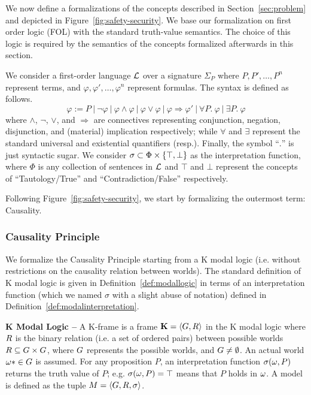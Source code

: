 We now define a formalizations of the concepts described in
Section~\ref{sec:problem} and depicted in Figure~\ref{fig:safety-security}. We
base our formalization on first order logic (FOL) with the standard
truth-value semantics. The choice of this logic is required by the 
semantics of the concepts formalized afterwards in this section. 

We consider a first-order language $\mathcal{L}$ over a
signature $\Sigma_P$ where $P,P',\ldots,P^n$ represent terms, and
$\varphi,\varphi',\ldots,\varphi^n$ represent formulas.
The syntax is defined as follows.
\begin{displaymath}
	\varphi := P~|~\neg\varphi~|~\varphi\wedge\varphi~|~\varphi\vee\varphi~|~\varphi\Rightarrow\varphi'~|~\forall P.~\varphi~|~\exists P.~\varphi
\end{displaymath}
where $\wedge$, $\neg$, $\vee$, and $\Rightarrow$ are connectives representing
conjunction, negation, disjunction, and (material) implication respectively; while
$\forall$ and $\exists$ represent the standard universal and existential
quantifiers (resp.). Finally, the symbol ``$.$'' is just syntactic sugar. 
We consider $\sigma\subset\Phi\times\{\top,\bot\}$ as the interpretation
function, where $\Phi$ is any collection of sentences in $\mathcal{L}$ 
and $\top$ and $\bot$ represent the concepts of ``Tautology/True''
and ``Contradiction/False'' respectively.

Following Figure~\ref{fig:safety-security}, we start by formalizing the outermost term: Causality.

\subsubsection{Causality Principle}\label{sec:causality}
We formalize the Causality Principle starting from a K modal
logic\autocite{Garson2018modal} (i.e. without restrictions on the causality
relation between worlds). The standard definition of K modal logic is given in
Definition~\ref{def:modallogic} in terms of an interpretation function (which
we named $\sigma$ with a slight abuse of notation) defined in
Definition~\ref{def:modalinterpretation}. 
\begin{definition}{\bf K Modal Logic --}\label{def:modallogic}
A K-frame is a frame $ \mathbf{K}=\langle G,R \rangle $
	in the K modal logic where $ R $ is the binary relation
	(i.e. a set of ordered pairs) between possible worlds
	$R\subseteq G\times G$, where
	$G$ represents the possible worlds, and
	$G\neq\emptyset$. An actual world
	$\omega*\in G$ is assumed. For any proposition $P$,
	an interpretation function $\sigma(\omega,P)$ returns the
	truth value of $P$; e.g. $\sigma(\omega,P)=\top$ means that
	$P$ holds in $\omega$. A model is defined as the tuple
	$M=\langle G,R,\sigma\rangle$.
\end{definition}

